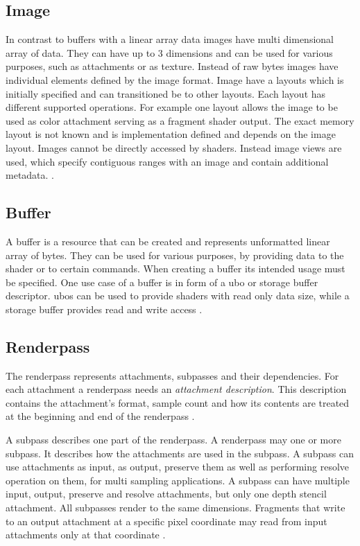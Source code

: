 \subsection{Image}
In contrast to buffers with a linear array data images have multi dimensional array of data. They can have up to 3 dimensions and can be used for various purposes, such as attachments or as texture. Instead of raw bytes images have individual elements defined by the image format. Image have a layouts which is initially specified and can transitioned be to other layouts. Each layout has different supported operations.
For example one layout allows the image to be used as color attachment serving as a fragment shader output. The exact memory layout is not known and is implementation defined and depends on the image layout. 
Images cannot be directly accessed by shaders. Instead image views are used, which specify contiguous ranges with an image and contain additional metadata.   \cite{khronos:vulkan:spec1.1}.

\subsection{Buffer}
\label{section:buffer}
A buffer is a resource that can be created and represents unformatted linear array of bytes. They can be used for various purposes, by providing data to the shader or to certain commands. When creating a buffer its intended usage must be specified. One use case of a buffer is in form of a \gls{ubo} or storage buffer descriptor. \Glspl{ubo} can be used to provide shaders with read only data size, while a storage buffer provides read and write access \cite{khronos:vulkan:spec1.1}.

\subsection{Renderpass}
\label{section:renderpass}


The renderpass represents attachments, subpasses and their dependencies. For each attachment a renderpass needs an \textit{attachment description}. This description contains the attachment's format, sample count and how its contents are treated at the beginning and end of the renderpass \cite{khronos:vulkan:spec1.1}.

A subpass describes  one part of the renderpass. A renderpass may one or more subpass. It describes how the attachments are used in the subpass. A subpass can use attachments as input, as output, preserve them as well as performing resolve operation on them, for multi sampling applications. A subpass can have multiple input, output, preserve and resolve attachments, but only one depth stencil attachment. All subpasses render to the same dimensions. Fragments that write to an output attachment at a specific pixel coordinate may read from input attachments only at that coordinate \cite{khronos:vulkan:spec1.1}.

